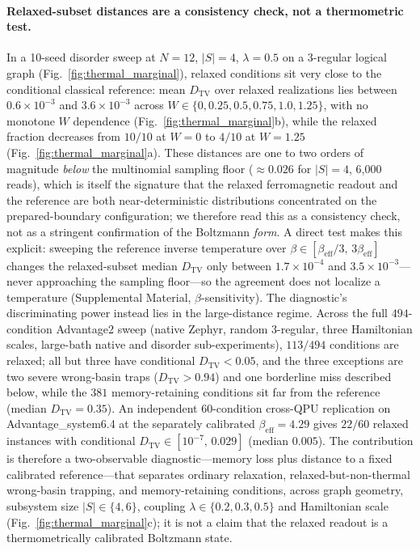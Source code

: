 \paragraph{Relaxed-subset distances are a consistency check, not a thermometric test.}
In a 10-seed disorder sweep at $N=12$, $|S|=4$, $\lambda=0.5$ on a 3-regular logical graph (Fig.~\ref{fig:thermal_marginal}), relaxed conditions sit very close to the conditional classical reference: mean $D_\mathrm{TV}$ over relaxed realizations lies between $0.6\times 10^{-3}$ and $3.6\times 10^{-3}$ across $W\in\{0,0.25,0.5,0.75,1.0,1.25\}$, with no monotone $W$ dependence (Fig.~\ref{fig:thermal_marginal}b), while the relaxed fraction decreases from $10/10$ at $W=0$ to $4/10$ at $W=1.25$ (Fig.~\ref{fig:thermal_marginal}a).
These distances are one to two orders of magnitude \emph{below} the multinomial sampling floor ($\approx 0.026$ for $|S|=4$, 6{,}000 reads), which is itself the signature that the relaxed ferromagnetic readout and the reference are both near-deterministic distributions concentrated on the prepared-boundary configuration; we therefore read this as a consistency check, not as a stringent confirmation of the Boltzmann \emph{form}.
A direct test makes this explicit: sweeping the reference inverse temperature over $\beta\in[\beta_\mathrm{eff}/3,\,3\beta_\mathrm{eff}]$ changes the relaxed-subset median $D_\mathrm{TV}$ only between $1.7\times 10^{-4}$ and $3.5\times 10^{-3}$---never approaching the sampling floor---so the agreement does not localize a temperature (Supplemental Material, $\beta$-sensitivity).
The diagnostic's discriminating power instead lies in the large-distance regime.
Across the full $494$-condition Advantage2 sweep (native Zephyr, random 3-regular, three Hamiltonian scales, large-bath native and disorder sub-experiments), $113/494$ conditions are relaxed; all but three have conditional $D_\mathrm{TV}<0.05$, and the three exceptions are two severe wrong-basin traps ($D_\mathrm{TV}>0.94$) and one borderline miss described below, while the $381$ memory-retaining conditions sit far from the reference (median $D_\mathrm{TV}=0.35$).
An independent $60$-condition cross-QPU replication on Advantage\_system6.4 at the separately calibrated $\beta_\mathrm{eff}=4.29$ gives $22/60$ relaxed instances with conditional $D_\mathrm{TV}\in[10^{-7},\,0.029]$ (median $0.005$).
The contribution is therefore a two-observable diagnostic---memory loss plus distance to a fixed calibrated reference---that separates ordinary relaxation, relaxed-but-non-thermal wrong-basin trapping, and memory-retaining conditions, across graph geometry, subsystem size $|S|\in\{4,6\}$, coupling $\lambda\in\{0.2,0.3,0.5\}$ and Hamiltonian scale (Fig.~\ref{fig:thermal_marginal}c); it is not a claim that the relaxed readout is a thermometrically calibrated Boltzmann state.

